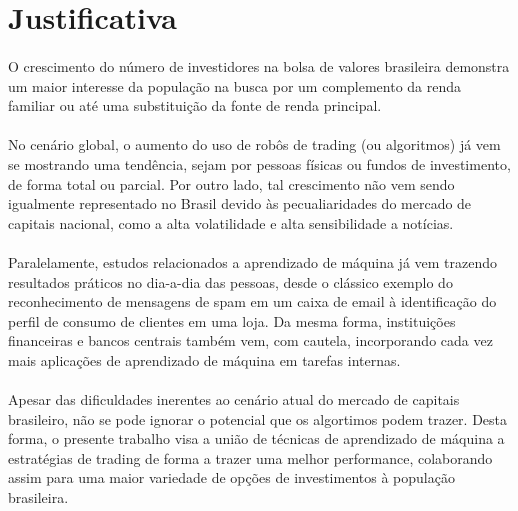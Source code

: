 \section{Justificativa}

\paragraph{} O crescimento do número de investidores na bolsa de valores brasileira\cite{aumento_investidores} demonstra um maior interesse da população na busca por um complemento da renda familiar ou até uma substituição da fonte de renda principal.

\paragraph{} No cenário global, o aumento do uso de robôs de trading (ou algoritmos) já vem se mostrando uma tendência\cite{robos_investidores}, sejam por pessoas físicas ou fundos de investimento, de forma total ou parcial. Por outro lado, tal crescimento não vem sendo igualmente representado no Brasil devido às pecualiaridades do mercado de capitais nacional, como a alta volatilidade e alta sensibilidade a notícias\cite{robos_e_fundos}.

\paragraph{} Paralelamente, estudos relacionados a aprendizado de máquina já vem trazendo resultados práticos no dia-a-dia das pessoas, desde o clássico exemplo do reconhecimento de mensagens de spam em um caixa de email à identificação do perfil de consumo de clientes em uma loja. Da mesma forma, instituições financeiras e bancos centrais também vem, com cautela, incorporando cada vez mais aplicações de aprendizado de máquina em tarefas internas\cite{ml_finantial_usage}.

\paragraph{} Apesar das dificuldades inerentes ao cenário atual do mercado de capitais brasileiro, não se pode ignorar o potencial que os algortimos podem trazer. Desta forma, o presente trabalho visa a união de técnicas de aprendizado de máquina a estratégias de trading de forma a trazer uma melhor performance, colaborando assim para uma maior variedade de opções de investimentos à população brasileira.

